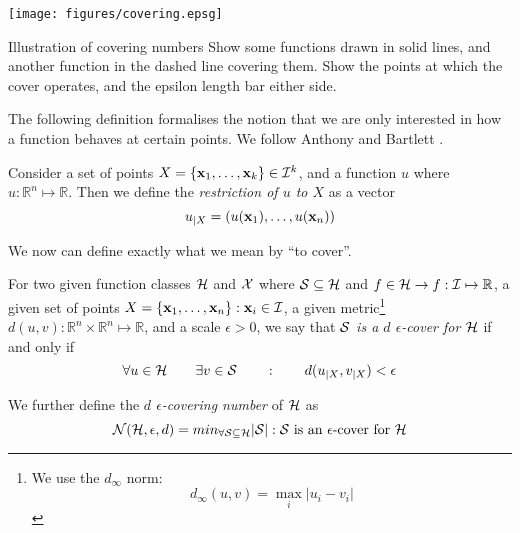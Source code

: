 \begin{linefigure}
\begin{center}
\texttt{[image: figures/covering.epsg]}
\end{center}
\begin{capt}{Illustration of covering numbers}
Show some functions drawn in solid lines, and another function in the
dashed line covering them.  Show the points at which the cover
operates, and the epsilon length bar either side.
\end{capt}
\end{linefigure}

The following definition formalises the notion that we are only
interested in how a function behaves at certain points.  We follow
Anthony and Bartlett \cite{Anthony98}.

\begin{definition}
\label{def:restriction}
Consider a set of points $X = \{\mathbf{x}_1, \ldots, \mathbf{x}_k\} \in \mathcal{I}^k$,
and a function $u$ where $u : \mathbb{R}^n \mapsto \mathbb{R}$.  Then
we define the \emph{restriction of $u$ to $X$} as a vector
%
\begin{equation}
u_{|X} = (u(\mathbf{x}_1), \ldots, u(\mathbf{x}_n))
\end{equation}
\end{definition}

We now can define exactly what we mean by ``to cover''.

\begin{definition}
\label{def:covering}
\label{def:covering numbers}
For two given function classes $\mathcal{H}$ and $\mathcal{X}$ where $\mathcal{S}
\subseteq \mathcal{H}$ and $f \in \mathcal{H} \rightarrow f : \mathcal{I} \mapsto
\mathbb{R}$, a given set of points $X = \{\mathbf{x}_1, \ldots, \mathbf{x}_n\} : \mathbf{x}_i \in
\mathcal{I}$, a given metric\footnote{We use the $d_{\infty}$ norm: 
\[ d_{\infty}(u, v) = \max_{i} |u_i - v_i| \]} $d(u, v) : \mathbb{R}^n
\times \mathbb{R}^n \mapsto 
\mathbb{R}$, and a scale $\epsilon > 0$, we say that \emph{$\mathcal{S}$ is a
$d$ $\epsilon$-cover for $\mathcal{H}$} if and only if
\begin{equation}
\forall u \in \mathcal{H} \qquad \exists v \in \mathcal{S} \qquad : \qquad
d(u_{|X}, v_{|X}) < \epsilon
\end{equation}

We further define the \emph{$d$ $\epsilon$-covering number} of $\mathcal{H}$
as 
\begin{equation}
\mathcal{N}({\mathcal{H}}, {\epsilon}, {d}) = min_{\forall \mathcal{S} \subseteq
\mathcal{H}}|\mathcal{S}| : \mbox{$\mathcal{S}$ is an $\epsilon$-cover for $\mathcal{H}$}
\end{equation}
\end{definition}


